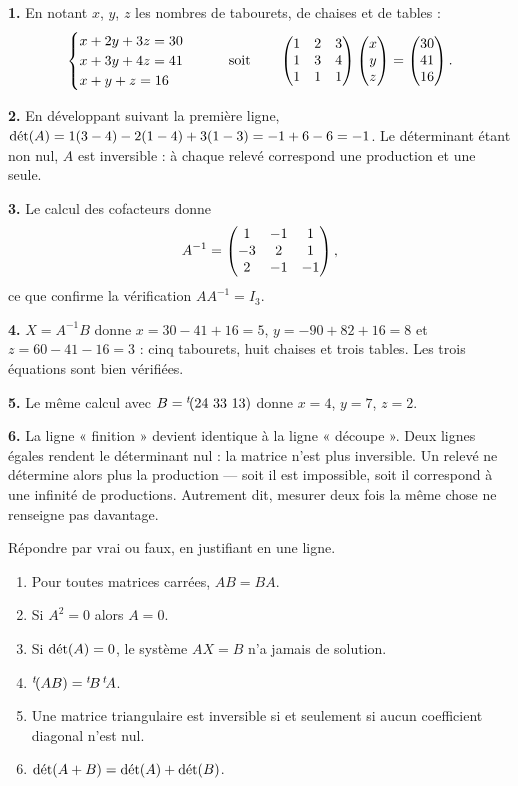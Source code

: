 \begin{corrige}
\textbf{1.} En notant $x$, $y$, $z$ les nombres de tabourets, de chaises et de
tables :
\[
  \begin{cases} x+2y+3z = 30 \\ x+3y+4z = 41 \\ x+y+z = 16 \end{cases}
  \qquad\text{soit}\qquad
  \begin{pmatrix} 1 & 2 & 3 \\ 1 & 3 & 4 \\ 1 & 1 & 1 \end{pmatrix}
  \begin{pmatrix} x \\ y \\ z \end{pmatrix}
  = \begin{pmatrix} 30 \\ 41 \\ 16 \end{pmatrix}.
\]

\textbf{2.} En développant suivant la première ligne,
$\operatorname{d\acute{e}t}(A) = 1(3-4)-2(1-4)+3(1-3) = -1+6-6 = -1$. Le déterminant étant non
nul, $A$ est inversible : à chaque relevé correspond une production et une
seule.

\textbf{3.} Le calcul des cofacteurs donne
\[
  A^{-1} = \begin{pmatrix} 1 & -1 & 1 \\ -3 & 2 & 1 \\ 2 & -1 & -1 \end{pmatrix},
\]
ce que confirme la vérification $AA^{-1} = I_{3}$.

\textbf{4.} $X = A^{-1}B$ donne
$x = 30-41+16 = 5$, $y = -90+82+16 = 8$ et $z = 60-41-16 = 3$ : cinq
tabourets, huit chaises et trois tables. Les trois équations sont bien
vérifiées.

\textbf{5.} Le même calcul avec $B = {}^{t}\!(24\ 33\ 13)$ donne
$x = 4$, $y = 7$, $z = 2$.

\textbf{6.} La ligne « finition » devient identique à la ligne « découpe ».
Deux lignes égales rendent le déterminant nul : la matrice n'est plus
inversible. Un relevé ne détermine alors plus la production — soit il est
impossible, soit il correspond à une infinité de productions. Autrement dit,
mesurer deux fois la même chose ne renseigne pas davantage.
\end{corrige}

\begin{jemeteste}
Répondre par vrai ou faux, en justifiant en une ligne.

\begin{enumerate}[label=\textbf{\arabic*.}, leftmargin=*, itemsep=0.28em]
  \item Pour toutes matrices carrées, $AB = BA$.
  \item Si $A^{2} = 0$ alors $A = 0$.
  \item Si $\operatorname{d\acute{e}t}(A) = 0$, le système $AX = B$ n'a jamais de solution.
  \item ${}^{t}\!(AB) = {}^{t}\!B\,{}^{t}\!A$.
  \item Une matrice triangulaire est inversible si et seulement si aucun
        coefficient diagonal n'est nul.
  \item $\operatorname{d\acute{e}t}(A+B) = \operatorname{d\acute{e}t}(A)+\operatorname{d\acute{e}t}(B)$.
\end{enumerate}
\end{jemeteste}

